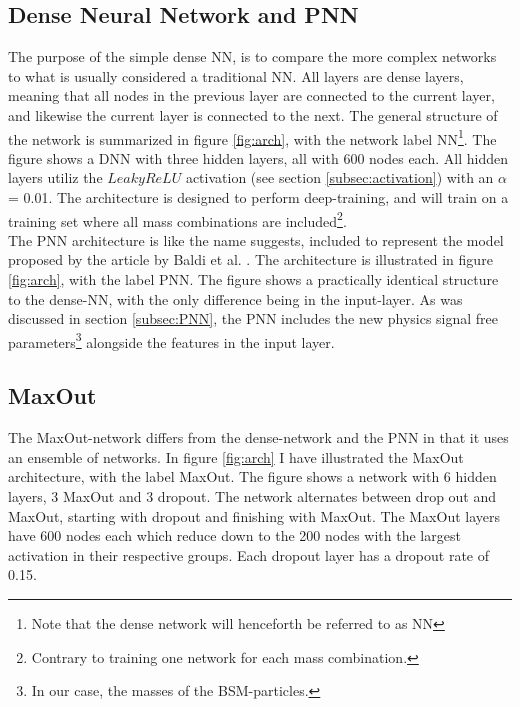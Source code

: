 \subsection*{Dense Neural Network and PNN}
The purpose of the simple dense \ac{NN}, is to compare the more complex networks to what is usually considered a traditional \ac{NN}.
All layers are dense layers, meaning that all nodes in the previous layer are connected to the current layer, and likewise
the current layer is connected to the next. The general structure of the network is summarized in figure \ref{fig:arch}, with 
the network label \ac{NN}\footnote{Note that the dense network will henceforth be referred to as \ac{NN}}. The figure shows a \ac{DNN} with 
three hidden layers, all with 600 nodes each. All hidden layers utiliz the $LeakyReLU$ activation (see section \ref{subsec:activation})
with an $\alpha$ = 0.01. The architecture is designed to perform deep-training, and will train on a training set where all mass combinations 
are included\footnote{Contrary to training one network for each mass combination.}. 
\\
The \ac{PNN} architecture is like the name suggests, included to represent the model proposed by the article by Baldi et al. \cite{PNN}.
The architecture is illustrated in figure \ref{fig:arch}, with the label PNN. The figure shows a practically identical 
structure to the dense-\ac{NN}, with the only difference being in the input-layer. As was discussed in section \ref{subsec:PNN},
the \ac{PNN} includes the new physics signal free parameters\footnote{In our case, the masses of the \ac{BSM}-particles.} alongside the features
in the input layer.
\subsection*{MaxOut}
The MaxOut-network differs from the dense-network and the \ac{PNN} in that it uses an ensemble of networks. In figure \ref{fig:arch}
I have illustrated the MaxOut architecture, with the label MaxOut. The figure shows a network with 6 hidden layers, 3 MaxOut and 3 dropout.
The network alternates between drop out and MaxOut, starting with dropout and finishing with MaxOut. The MaxOut layers have 600 nodes each 
which reduce down to the 200 nodes with the largest activation in their respective groups. Each dropout layer has a dropout rate of 0.15.
\\



